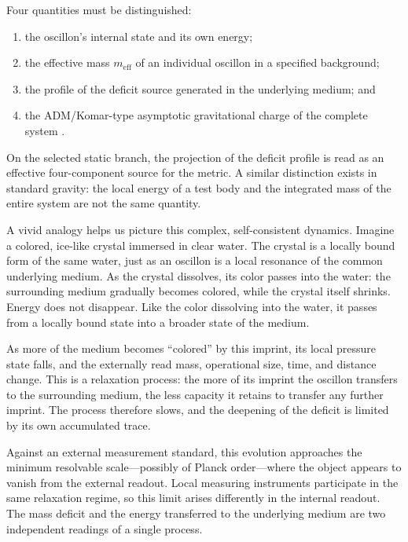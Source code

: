 \documentclass[11pt,a4paper]{article}
\begin{document}
Four quantities must be distinguished:

\begin{enumerate}
\item the oscillon's internal state and its own energy;
\item the effective mass $m_{\mathrm{eff}}$ of an individual oscillon in a specified background;
\item the profile of the deficit source generated in the underlying medium; and
\item the ADM/Komar-type asymptotic gravitational charge of the complete system \citep{arnowitt1962,komar1959}.
\end{enumerate}

On the selected static branch, the projection of the deficit profile is read as an effective four-component source for the metric. A similar distinction exists in standard gravity: the local energy of a test body and the integrated mass of the entire system are not the same quantity.

A vivid analogy helps us picture this complex, self-consistent dynamics. Imagine a colored, ice-like crystal immersed in clear water. The crystal is a locally bound form of the same water, just as an oscillon is a local resonance of the common underlying medium. As the crystal dissolves, its color passes into the water: the surrounding medium gradually becomes colored, while the crystal itself shrinks. Energy does not disappear. Like the color dissolving into the water, it passes from a locally bound state into a broader state of the medium.

As more of the medium becomes ``colored'' by this imprint, its local pressure state falls, and the externally read mass, operational size, time, and distance change. This is a relaxation process: the more of its imprint the oscillon transfers to the surrounding medium, the less capacity it retains to transfer any further imprint. The process therefore slows, and the deepening of the deficit is limited by its own accumulated trace.

Against an external measurement standard, this evolution approaches the minimum resolvable scale---possibly of Planck order---where the object appears to vanish from the external readout. Local measuring instruments participate in the same relaxation regime, so this limit arises differently in the internal readout. The mass deficit and the energy transferred to the underlying medium are two independent readings of a single process.
\end{document}
